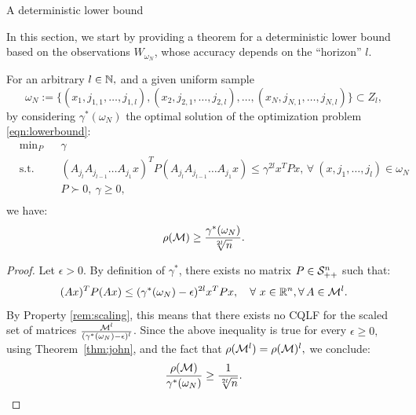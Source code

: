 \begin{subsection}{A deterministic lower bound}

In this section, we start by providing a theorem for a deterministic lower bound based on the observations $W_{\omega_N}$, whose accuracy depends on the ``horizon'' $l$.
\begin{theorem}\label{thm:lowerbound}
For an arbitrary $l \in \mathbb{N},$ and a given uniform sample $$\omega_N := \{(x_1, j_{1,1},\dots,j_{1,l}), (x_2, j_{2,1},\dots,j_{2,l}), \ldots, (x_N, j_{N,1},\dots,j_{N,l})\} \subset Z_l,$$ 
by considering $\gamma^*(\omega_N)$ the optimal solution of the optimization problem \eqref{eqn:lowerbound}:
\begin{equation}
\begin{aligned}
& \text{min}_P & & \gamma \\
& \text{s.t.} 
&  & (A_{j_l} A_{j_{l-1}} \dots A_{j_1} x)^T P (A_{j_l} A_{j_{l-1}} \dots A_{j_1} x) \leq \gamma^{2l} x^T P x, \,  \forall\ (x,j_1,\dots,j_l) \in \omega_N\\
& && P \succ 0,\ \gamma \geq 0, \\
\end{aligned}
\end{equation}
we have:
$$\rho(\mathcal{M}) \geq \frac{\gamma^*(\omega_N)}{\sqrt[2l]{n}}.$$ 
\end{theorem}
\begin{proof}
Let $\epsilon >0$. By definition of $\gamma^*$,  there exists no matrix $P \in \mathcal{S}^n_{++}$ such that:
\begin{equation*}
(Ax)^T P (Ax) \leq (\gamma^*(\omega_N) -\epsilon)^{2l} x^T P x,\quad \forall\ x \in \mathbb{R}^n, \forall\, A \in \mathcal{M}^{l}.
\end{equation*}
By Property \ref{rem:scaling}, this means that there exists no CQLF for the scaled set of matrices $\frac{\mathcal{M}^l}{(\gamma^*(\omega_N)-\epsilon)^l}$. Since the above inequality is true for every $\epsilon\geq 0,$ using Theorem~\ref{thm:john}, and the fact that $\rho(\mathcal{M}^l)=\rho(\mathcal{M})^l,$ we conclude:
\begin{equation*}
\frac{\rho(\mathcal{M})}{\gamma^*(\omega_N)} \geq \frac{1}{\sqrt[2l]{n}}.
\end{equation*}
\end{proof}
\end{subsection}

